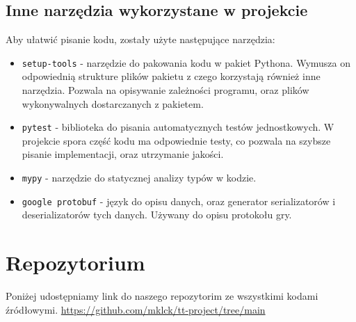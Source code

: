 \documentclass[a4paper,12pt]{article}
\begin{document}
\subsection{Inne narzędzia wykorzystane w projekcie}

Aby ułatwić pisanie kodu, zostały użyte następujące narzędzia:

\begin{itemize}
	\item \texttt{setup-tools} - narzędzie do pakowania kodu w pakiet Pythona.
	Wymusza on odpowiednią strukture plików pakietu z czego korzystają również
	inne narzędzia. Pozwala na opisywanie zależności programu, oraz plików
	wykonywalnych dostarczanych z pakietem.
	\item \texttt{pytest} - biblioteka do pisania automatycznych testów jednostkowych.
	W projekcie spora część kodu ma odpowiednie testy, co pozwala na szybsze pisanie
	implementacji, oraz utrzymanie jakości.
	\item \texttt{mypy} - narzędzie do statycznej analizy typów w kodzie.
	\item \texttt{google protobuf} - język do opisu danych, oraz generator
	serializatorów i deserializatorów tych danych. Używany do opisu protokołu
	gry.
\end{itemize}

\section{Repozytorium}
Poniżej udostępniamy link do naszego repozytorim ze wszystkimi kodami źródłowymi.
\newline
\url{https://github.com/mklck/tt-project/tree/main}
\end{document}
